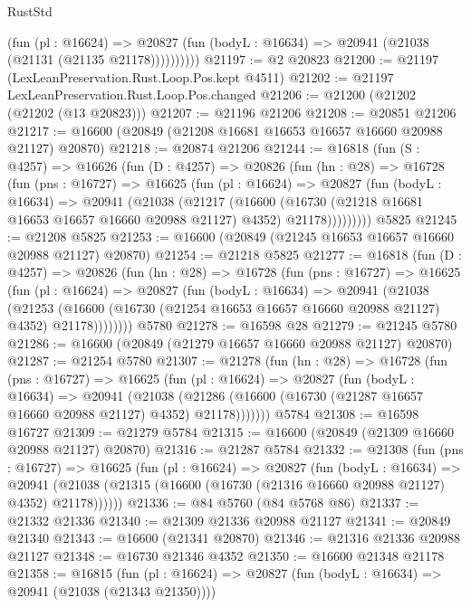 \begin{lexlean}{RustStd}
\begin{coremodule}
{\begin{coremodule}
{{{{{{{{{{{{{{{{{{{{{{{{{{{{{{{{{{{{{{{{{{{{{{{{{{{{{{{              (fun (pl : @16624) =>
              @20827 (fun (bodyL : @16634) => @20941 (@21038 (@21131 (@21135 @21178))))))))))
@21197 := @2 @20823
@21200 := @21197 (LexLeanPreservation.Rust.Loop.Pos.kept @4511)
@21202 := @21197 LexLeanPreservation.Rust.Loop.Pos.changed
@21206 := @21200 (@21202 (@21202 (@13 @20823)))
@21207 := @21196 @21206
@21208 := @20851 @21206
@21217 := @16600 (@20849 (@21208 @16681 @16653 @16657 @16660 @20988 @21127) @20870)
@21218 := @20874 @21206
@21244 := @16818
    (fun (S : @4257) =>
    @16626
      (fun (D : @4257) =>
      @20826
        (fun (hn : @28) =>
        @16728
          (fun (pns : @16727) =>
          @16625
            (fun (pl : @16624) =>
            @20827
              (fun (bodyL : @16634) =>
              @20941
                (@21038
                  (@21217
                    (@16600
                      (@16730 (@21218 @16681 @16653 @16657 @16660 @20988 @21127) @4352)
                      @21178)))))))))
    @5825
@21245 := @21208 @5825
@21253 := @16600 (@20849 (@21245 @16653 @16657 @16660 @20988 @21127) @20870)
@21254 := @21218 @5825
@21277 := @16818
    (fun (D : @4257) =>
    @20826
      (fun (hn : @28) =>
      @16728
        (fun (pns : @16727) =>
        @16625
          (fun (pl : @16624) =>
          @20827
            (fun (bodyL : @16634) =>
            @20941
              (@21038
                (@21253
                  (@16600 (@16730 (@21254 @16653 @16657 @16660 @20988 @21127) @4352) @21178))))))))
    @5780
@21278 := @16598 @28
@21279 := @21245 @5780
@21286 := @16600 (@20849 (@21279 @16657 @16660 @20988 @21127) @20870)
@21287 := @21254 @5780
@21307 := @21278
    (fun (hn : @28) =>
    @16728
      (fun (pns : @16727) =>
      @16625
        (fun (pl : @16624) =>
        @20827
          (fun (bodyL : @16634) =>
          @20941
            (@21038
              (@21286 (@16600 (@16730 (@21287 @16657 @16660 @20988 @21127) @4352) @21178)))))))
    @5784
@21308 := @16598 @16727
@21309 := @21279 @5784
@21315 := @16600 (@20849 (@21309 @16660 @20988 @21127) @20870)
@21316 := @21287 @5784
@21332 := @21308
    (fun (pns : @16727) =>
    @16625
      (fun (pl : @16624) =>
      @20827
        (fun (bodyL : @16634) =>
        @20941 (@21038 (@21315 (@16600 (@16730 (@21316 @16660 @20988 @21127) @4352) @21178))))))
@21336 := @84 @5760 (@84 @5768 @86)
@21337 := @21332 @21336
@21340 := @21309 @21336 @20988 @21127
@21341 := @20849 @21340
@21343 := @16600 (@21341 @20870)
@21346 := @21316 @21336 @20988 @21127
@21348 := @16730 @21346 @4352
@21350 := @16600 @21348 @21178
@21358 := @16815
    (fun (pl : @16624) => @20827 (fun (bodyL : @16634) => @20941 (@21038 (@21343 @21350))))
}}}}}}}}}}}}}}}}}}}}}}}}}}}}}}}}}}}}}}}}}}}}}}}}}}}}}}}
\end{coremodule}}
\end{coremodule}
\end{lexlean}

